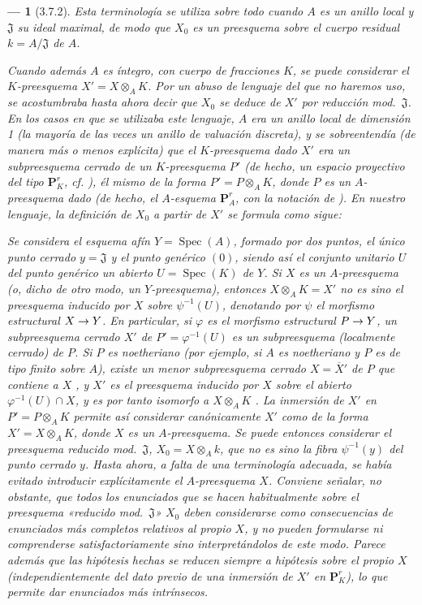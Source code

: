 \documentclass[oneside]{amsart}
\theoremstyle{ega-env-style}
\newtheorem*{env}{---}
\theoremstyle{ega-thm-env-style}
\theoremstyle{ega-defn-env-style}
\renewcommand{\to}{\mathchoice{\longrightarrow}{\rightarrow}{\rightarrow}{\rightarrow}}
\newcommand{\oldpage}[2][]{{\marginnote{\normalfont{\textbf{#1}~|~#2}}}\ignorespaces}
\let\EGAOriginalLabel\label
\renewcommand{\label}[1]{\phantomsection\EGAOriginalLabel{#1}}
\begin{document}
\begin{env}[3.7.2]
\label{I.3.7.2}
Esta terminología se utiliza sobre todo cuando $A$ es un \emph{anillo local} y $\mathfrak{J}$ su ideal maximal, de modo que $X_0$ es un preesquema sobre el cuerpo residual $k=A/\mathfrak{J}$ de $A$.

Cuando además $A$ es íntegro, con cuerpo de fracciones $K$, se puede considerar el $K$-preesquema $X'=X\otimes_A K$.
Por un abuso de lenguaje del que no haremos uso, se acostumbraba hasta ahora decir que $X_0$ se \emph{deduce de $X'$} por reducción mod.~$\mathfrak{J}$.
En los casos en que se utilizaba este lenguaje, $A$ era un anillo local de dimensión 1 (la mayoría de las veces un anillo de valuación discreta), y se sobreentendía (de manera más o menos explícita) que el $K$-preesquema dado $X'$ era un subpreesquema cerrado de un $K$-preesquema $P'$ (de hecho, un espacio proyectivo del tipo $\mathbf{P}_K^r$, cf. ), él mismo de la forma $P'=P\otimes_A K$, donde $P$ es un $A$-preesquema dado (de hecho, el $A$-esquema $\mathbf{P}_A^r$, con la notación de ).
En nuestro lenguaje, la definición de $X_0$ a partir de $X'$ se formula como sigue:

Se considera el esquema afín $Y=\operatorname{Spec}(A)$, formado por dos puntos, el único punto cerrado
\oldpage[I]{119}
$y=\mathfrak{J}$ y el punto genérico $(0)$, siendo así el conjunto unitario $U$ del punto genérico un abierto $U=\operatorname{Spec}(K)$ de $Y$.
Si $X$ es un $A$-preesquema (o, dicho de otro modo, un $Y$-preesquema), entonces $X\otimes_A K=X'$ no es sino el preesquema inducido por $X$ sobre $\psi^{-1}(U)$, denotando por $\psi$ el morfismo estructural $X\to Y$.
En particular, si $\varphi$ es el morfismo estructural $P\to Y$, un subpreesquema cerrado $X'$ de $P'=\varphi^{-1}(U)$ es un subpreesquema (localmente cerrado) de $P$.
Si $P$ es noetheriano (por ejemplo, si $A$ es noetheriano y $P$ es de tipo finito sobre $A$), existe un menor subpreesquema cerrado $X=\overline{X}'$ de $P$ que contiene a $X$ , y $X'$ es el preesquema inducido por $X$ sobre el abierto $\varphi^{-1}(U)\cap X$, y es por tanto isomorfo a $X\otimes_A K$ .
\emph{La inmersión de $X'$ en $P'=P\otimes_A K$ permite así considerar canónicamente $X'$ como de la forma $X'=X\otimes_A K$, donde $X$ es un $A$-preesquema.}
Se puede entonces considerar el preesquema reducido mod.~$\mathfrak{J}$, $X_0=X\otimes_A k$, que no es sino la fibra $\psi^{-1}(y)$ del punto cerrado $y$.
Hasta ahora, a falta de una terminología adecuada, se había evitado introducir explícitamente el $A$-preesquema $X$.
Conviene señalar, no obstante, que todos los enunciados que se hacen habitualmente sobre el preesquema «reducido mod.~$\mathfrak{J}$» $X_0$ deben considerarse como consecuencias de enunciados más completos relativos al propio $X$, y no pueden formularse ni comprenderse satisfactoriamente sino interpretándolos de este modo.
Parece además que las hipótesis hechas se reducen siempre a hipótesis sobre el propio $X$ (independientemente del dato previo de una inmersión de $X'$ en $\mathbf{P}_K^r$), lo que permite dar enunciados más intrínsecos.
\end{env}
\end{document}
